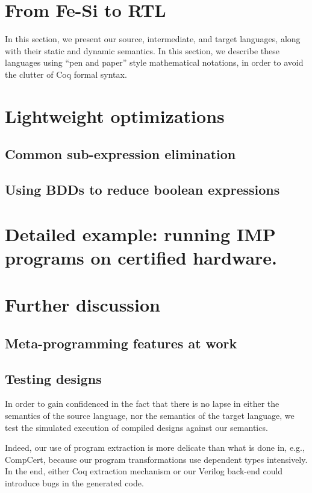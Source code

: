 \documentclass[preprint]{sigplanconf}
\begin{document}

\section{From Fe-Si to RTL}
In this section, we present our source, intermediate, and target
languages, along with their static and dynamic semantics.
%
In this section, we describe these languages using ``pen and paper''
style mathematical notations, in order to avoid the clutter of Coq
formal syntax.

\section{Lightweight optimizations}
\subsection{Common sub-expression elimination}
\subsection{Using BDDs to reduce boolean expressions}

\section{Detailed example: running IMP programs on certified
  hardware.}

\section{Further discussion}

\subsection{Meta-programming features at work}

\subsection{Testing designs}
In order to gain confidenced in the fact that there is no lapse in
either the semantics of the source language, nor the semantics of the
target language, we test the simulated execution of compiled designs
against our semantics. 

Indeed, our use of program extraction is more delicate than what is
done in, e.g., CompCert, because our program transformations use
dependent types intensively. In the end, either Coq extraction
mechanism or our Verilog back-end could introduce bugs in the
generated code.
\end{document}
